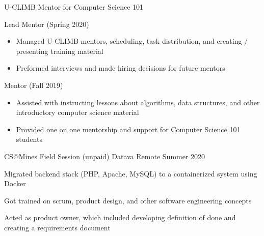 \begin{cventries}
    \vspace{-1.0mm}
    \cventry
    	{U-CLIMB Mentor for Computer Science 101}
    	{}
    	{ }
	   	 {}
   	 {
   	 \begin{cvitems}
         \item {Lead Mentor (Spring 2020)}
         \begin{itemize}
         \item {Managed U-CLIMB mentors, scheduling, task
    	distribution, and creating /
      presenting training material}
          \item {Preformed interviews and made hiring decisions for future mentors}
         \end{itemize}
         \ifcv
         \item {Mentor (Fall 2019)}
         \begin{itemize}
            	 \item {Assisted with instructing lessons about algorithms, data structures, and other introductory computer science material}
   	         \item {Provided one on one mentorship and support for
    	Computer Science 101 students}
        \end{itemize}
        \fi
      \end{cvitems}
      }
      {}

      \ifcv
    \cventry
    {CS@Mines Field Session (unpaid)}
    {Datava}
    {Remote}
    {Summer 2020}
    {
      \begin{cvitems}
        \item Migrated backend stack (PHP, Apache, MySQL) to a containerized system using Docker
        \item Got trained on scrum, product design, and other software engineering concepts
        \item Acted as product owner, which included developing definition of done and creating a requirements document
      \end{cvitems}
    }
    {}

    


\end{cventries}
